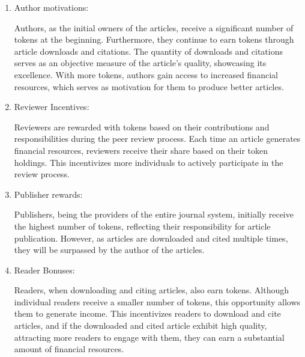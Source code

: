 \documentclass[lettersize,journal]{IEEEtran}
\begin{document}
\begin{enumerate}
  \item Author motivations:

        Authors, as the initial owners of the articles, receive a significant number of tokens at the beginning. Furthermore, they continue to earn tokens through article downloads and citations. The quantity of downloads and citations serves as an objective measure of the article's quality, showcasing its excellence. With more tokens, authors gain access to increased financial resources, which serves as motivation for them to produce better articles.

  \item Reviewer Incentives:

        Reviewers are rewarded with tokens based on their contributions and responsibilities during the peer review process. Each time an article generates financial resources, reviewers receive their share based on their token holdings. This incentivizes more individuals to actively participate in the review process.

  \item Publisher rewards:

        Publishers, being the providers of the entire journal system, initially receive the highest number of tokens, reflecting their responsibility for article publication. However, as articles are downloaded and cited multiple times, they will be surpassed by the author of the articles.

  \item Reader Bonuses:

        Readers, when downloading and citing articles, also earn tokens. Although individual readers receive a smaller number of tokens, this opportunity allows them to generate income. This incentivizes readers to download and cite articles, and if the downloaded and cited article exhibit high quality, attracting more readers to engage with them, they can earn a substantial amount of financial resources.

\end{enumerate}

\end{document}
